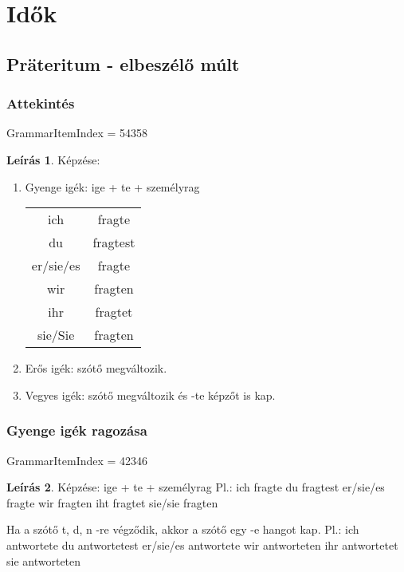 \documentclass{article}
\theoremstyle{definition}
\newtheorem*{desc}{Leírás}
\begin{document}
\section{Idők}

\subsection{Präteritum - elbeszélő múlt}

\subsubsection{Attekintés}

GrammarItemIndex = 54358

\begin{desc}
Képzése:
\begin{enumerate}
\item
Gyenge igék: ige + te + személyrag

\begin{tabular}{cc}
 ich & fragte \\
 du & fragtest \\
 er/sie/es & fragte \\
 wir & fragten \\
 ihr & fragtet \\
 sie/Sie & fragten
\end{tabular}

\item
Erős igék: szótő megváltozik.
\item
Vegyes igék: szótő megváltozik és -te képzőt is kap.
\end{enumerate}
\end{desc}

\subsubsection{Gyenge igék ragozása}

GrammarItemIndex = 42346

\begin{desc}
Képzése: ige + te + személyrag
Pl.:
ich fragte
du fragtest
er/sie/es fragte
wir fragten
iht fragtet
sie/sie fragten

Ha a szótő t, d, n -re végződik, akkor a szótő egy -e hangot kap.
Pl.:
ich	antwortete
du	antwortetest
er/sie/es	antwortete
wir	antworteten
ihr antwortetet
sie	antworteten
\end{desc}
\end{document}
